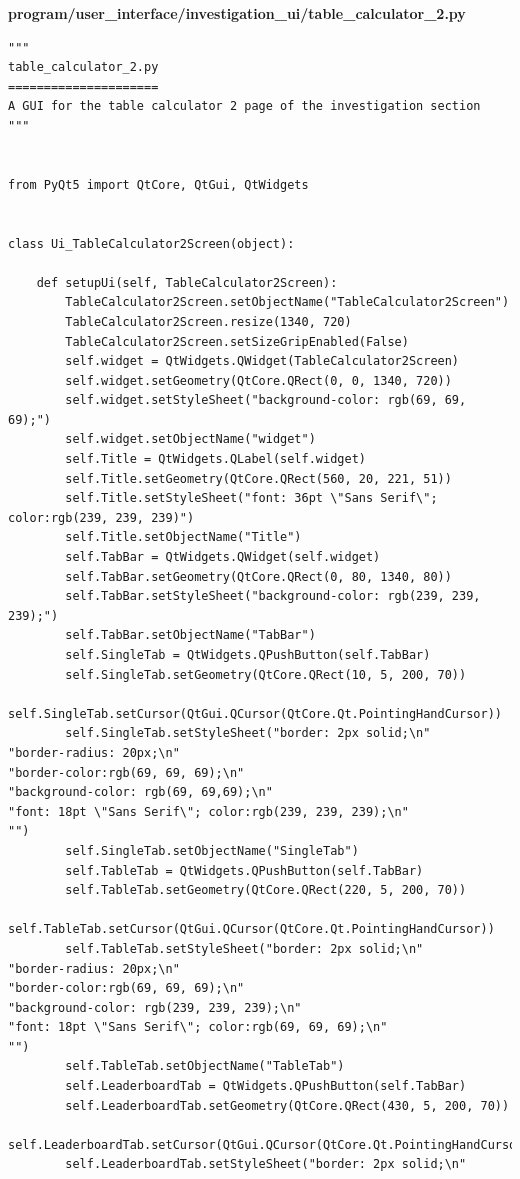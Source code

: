 \documentclass[12pt]{article}
\begin{document}
\textbf{program/user\_interface/investigation\_ui/table\_calculator\_2.py}
\begin{lstlisting}
"""
table_calculator_2.py
=====================
A GUI for the table calculator 2 page of the investigation section
"""


from PyQt5 import QtCore, QtGui, QtWidgets


class Ui_TableCalculator2Screen(object):

    def setupUi(self, TableCalculator2Screen):
        TableCalculator2Screen.setObjectName("TableCalculator2Screen")
        TableCalculator2Screen.resize(1340, 720)
        TableCalculator2Screen.setSizeGripEnabled(False)
        self.widget = QtWidgets.QWidget(TableCalculator2Screen)
        self.widget.setGeometry(QtCore.QRect(0, 0, 1340, 720))
        self.widget.setStyleSheet("background-color: rgb(69, 69, 69);")
        self.widget.setObjectName("widget")
        self.Title = QtWidgets.QLabel(self.widget)
        self.Title.setGeometry(QtCore.QRect(560, 20, 221, 51))
        self.Title.setStyleSheet("font: 36pt \"Sans Serif\"; color:rgb(239, 239, 239)")
        self.Title.setObjectName("Title")
        self.TabBar = QtWidgets.QWidget(self.widget)
        self.TabBar.setGeometry(QtCore.QRect(0, 80, 1340, 80))
        self.TabBar.setStyleSheet("background-color: rgb(239, 239, 239);")
        self.TabBar.setObjectName("TabBar")
        self.SingleTab = QtWidgets.QPushButton(self.TabBar)
        self.SingleTab.setGeometry(QtCore.QRect(10, 5, 200, 70))
        self.SingleTab.setCursor(QtGui.QCursor(QtCore.Qt.PointingHandCursor))
        self.SingleTab.setStyleSheet("border: 2px solid;\n"
"border-radius: 20px;\n"
"border-color:rgb(69, 69, 69);\n"
"background-color: rgb(69, 69,69);\n"
"font: 18pt \"Sans Serif\"; color:rgb(239, 239, 239);\n"
"")
        self.SingleTab.setObjectName("SingleTab")
        self.TableTab = QtWidgets.QPushButton(self.TabBar)
        self.TableTab.setGeometry(QtCore.QRect(220, 5, 200, 70))
        self.TableTab.setCursor(QtGui.QCursor(QtCore.Qt.PointingHandCursor))
        self.TableTab.setStyleSheet("border: 2px solid;\n"
"border-radius: 20px;\n"
"border-color:rgb(69, 69, 69);\n"
"background-color: rgb(239, 239, 239);\n"
"font: 18pt \"Sans Serif\"; color:rgb(69, 69, 69);\n"
"")
        self.TableTab.setObjectName("TableTab")
        self.LeaderboardTab = QtWidgets.QPushButton(self.TabBar)
        self.LeaderboardTab.setGeometry(QtCore.QRect(430, 5, 200, 70))
        self.LeaderboardTab.setCursor(QtGui.QCursor(QtCore.Qt.PointingHandCursor))
        self.LeaderboardTab.setStyleSheet("border: 2px solid;\n"

\end{lstlisting}
\end{document}
